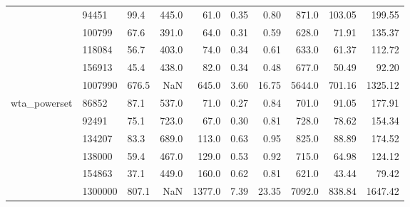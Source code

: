 \begin{tabular}{lllrrrrrrr}
             & 94451   & 99.4  &    445.0 &    61.0 &   0.35 &   0.80 &   871.0 &  103.05 &   199.55 \\
             & 100799  & 67.6  &    391.0 &    64.0 &   0.31 &   0.59 &   628.0 &   71.91 &   135.37 \\
             & 118084  & 56.7  &    403.0 &    74.0 &   0.34 &   0.61 &   633.0 &   61.37 &   112.72 \\
             & 156913  & 45.4  &    438.0 &    82.0 &   0.34 &   0.48 &   677.0 &   50.49 &    92.20 \\
             & 1007990 & 676.5 &      NaN &   645.0 &   3.60 &  16.75 &  5644.0 &  701.16 &  1325.12 \\
wta\_powerset & 86852   & 87.1  &    537.0 &    71.0 &   0.27 &   0.84 &   701.0 &   91.05 &   177.91 \\
             & 92491   & 75.1  &    723.0 &    67.0 &   0.30 &   0.81 &   728.0 &   78.62 &   154.34 \\
             & 134207  & 83.3  &    689.0 &   113.0 &   0.63 &   0.95 &   825.0 &   88.89 &   174.52 \\
             & 138000  & 59.4  &    467.0 &   129.0 &   0.53 &   0.92 &   715.0 &   64.98 &   124.12 \\
             & 154863  & 37.1  &    449.0 &   160.0 &   0.62 &   0.81 &   621.0 &   43.44 &    79.42 \\
             & 1300000 & 807.1 &      NaN &  1377.0 &   7.39 &  23.35 &  7092.0 &  838.84 &  1647.42 \\
\bottomrule
\end{tabular}
